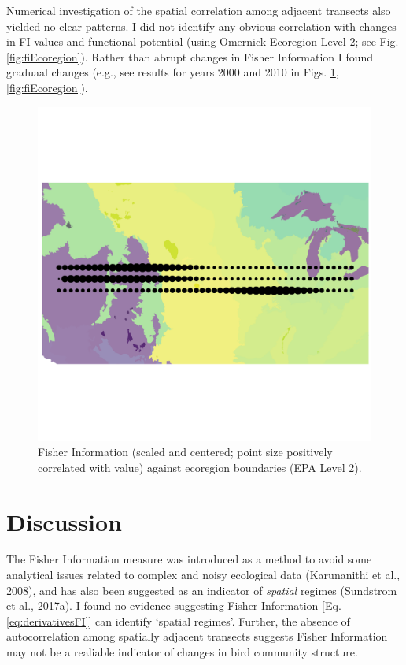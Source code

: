 \documentclass[12pt,twoside,openany]{reedthesis}
\begin{document}
Numerical investigation of the spatial correlation among adjacent
transects also yielded no clear patterns. I did not identify any obvious
correlation with changes in FI values and functional potential (using
Omernick Ecoregion Level 2; see Fig. \ref{fig:fiEcoregion}). Rather than
abrupt changes in Fisher Information I found graduaal changes (e.g., see
results for years 2000 and 2010 in Figs.
\ref{fig:fiEcoregion00},\ref{fig:fiEcoregion}).
\begin{figure}
\includegraphics[width=0.85\linewidth]{./chapterFiles/fisherSpatial/figures/figsCalledInDiss/scaledFiInterpolated_year2000_East-West} \caption{Fisher Information (scaled and centered; point size positively correlated with value) against ecoregion boundaries (EPA Level 2).}\label{fig:fiEcoregion00}
\end{figure}
\section{Discussion}\label{discussion-1}

The Fisher Information measure was introduced as a method to avoid some
analytical issues related to complex and noisy ecological data
(Karunanithi et al., 2008), and has also been suggested as an indicator
of \emph{spatial} regimes (Sundstrom et al., 2017a). I found no evidence
suggesting Fisher Information {[}Eq. \eqref{eq:derivativesFI}{]} can
identify `spatial regimes'. Further, the absence of autocorrelation
among spatially adjacent transects suggests Fisher Information may not
be a realiable indicator of changes in bird community structure.
\end{document}
